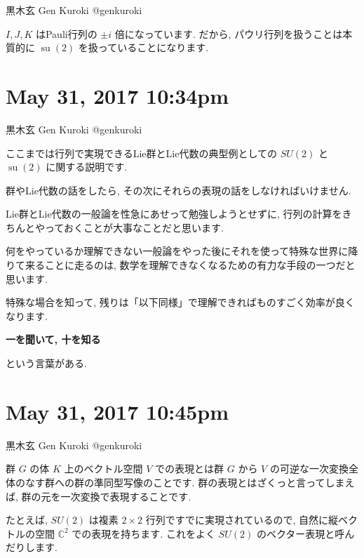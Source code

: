 \documentclass[12pt,twoside]{jarticle}
\theoremstyle{jplain}
\theoremstyle{jplain}
\theoremstyle{jplain}
\numberwithin{theorem}{section}
\numberwithin{equation}{section}
\numberwithin{figure}{section}
\numberwithin{table}{section}
\begin{document}
黒木玄 Gen Kuroki
@genkuroki


$I,J,K$ はPauli行列の $\pm i$ 倍になっています. だから, パウリ行列を扱うことは本質的に $\operatorname{su}(2)$ を扱っていることになります. 







\section{ May 31, 2017 10:34pm}








黒木玄 Gen Kuroki
@genkuroki


ここまでは行列で実現できるLie群とLie代数の典型例としての $SU(2)$ と $\operatorname{su}(2)$ に関する説明です. 

群やLie代数の話をしたら, その次にそれらの表現の話をしなければいけません. 

Lie群とLie代数の一般論を性急にあせって勉強しようとせずに, 行列の計算をきちんとやっておくことが大事なことだと思います. 

何をやっているか理解できない一般論をやった後にそれを使って特殊な世界に降りて来ることに走るのは, 数学を理解できなくなるための有力な手段の一つだと思います. 

特殊な場合を知って, 残りは「以下同様」で理解できればものすごく効率が良くなります. 
\begin{center}
{\Large\bfseries 一を聞いて, 十を知る} 
\end{center}
という言葉がある.






\section{ May 31, 2017 10:45pm}








黒木玄 Gen Kuroki
@genkuroki


群 $G$ の体 $K$ 上のベクトル空間 $V$ での表現とは群 $G$ から $V$ の可逆な一次変換全体のなす群への群の準同型写像のことです. 群の表現とはざくっと言ってしまえば, 群の元を一次変換で表現することです. 

たとえば, $SU(2)$ は複素 $2\times 2$ 行列ですでに実現されているので, 自然に縦ベクトルの空間 $\mathbb C^2$ での表現を持ちます. これをよく $SU(2)$ のベクター表現と呼んだりします. 
\end{document}

